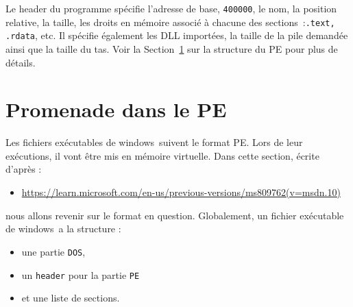 \documentclass{book}
\newcommand{\code}[1]{\texttt{#1}}
\newcommand{\Windows}{{\sc windows}}
\begin{document}
Le header du programme spécifie l'adresse de base, \code{400000}, le nom, la position relative, la taille, les droits en mémoire associé à chacune des sections~:\code{.text, .rdata}, etc. Il spécifie également les DLL importées, la taille de la pile demandée ainsi que la taille du tas. Voir la Section~\ref{sec:pe} sur la structure du PE pour plus de détails. 


\section{Promenade dans le PE} \label{sec:pe}

Les fichiers exécutables de \Windows\ suivent le format PE.  Lors de leur exécutions, il vont être mis en mémoire virtuelle. Dans cette section, écrite d'après : 
\begin{itemize}
	\item \url{https://learn.microsoft.com/en-us/previous-versions/ms809762(v=msdn.10)}
\end{itemize}
nous allons revenir sur le format en question. Globalement, un fichier exécutable de \Windows\ a la structure : 
\begin{itemize}
	\item une partie \code{DOS},
	\item un \code{header} pour la partie \code{PE}
	\item et une liste de sections.
\end{itemize} 

\end{document}
